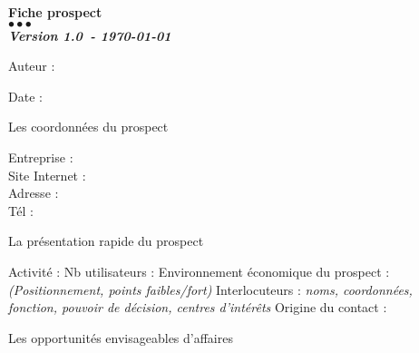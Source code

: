 \documentclass[a4paper, oneside, 12pt, french]{article}
\newcommand{\TYPE}{Fiche prospect}
\newcommand{\NUMREV}{Version 1.0}
\newcommand{\DATEREV}{\today}
\begin{document}
\begin{center}
\huge \bf \TYPE \\
\textcolor{Symeos_Red}{$\bullet \bullet$}\textcolor{Symeos_Grey}{$\bullet$}\\
\small \textit{\NUMREV \ - \DATEREV} 
\end{center}

\begin{fminipage}
\begin{minipage}{.5\textwidth}
Auteur : 
\newline
\end{minipage}
\hspace{2mm}
\begin{minipage}{0.48\textwidth}
Date :
\newline
\end{minipage}
\end{fminipage}

{\Large Les coordonnées du prospect}

\begin{fminipage}
\vspace{12pt}
Entreprise : \\
\hspace*{10cm} Site Internet : \\
Adresse : \\
\hspace*{10cm} Tél : \\
\vspace{36pt}
\end{fminipage}

{\Large La présentation rapide du prospect}

\begin{fminipage}
\vspace{12pt}
Activité : 
\newline
Nb utilisateurs : 
\newline
Environnement économique du prospect : \textit{(Positionnement, points faibles/fort)}
\newline
\newline
Interlocuteurs : \textit{noms, coordonnées, fonction, pouvoir de décision, centres d'intérêts}
\newline
\newline
\newline
\newline
Origine du contact :
\end{fminipage}

{\Large Les opportunités envisageables d'affaires}
\end{document}
